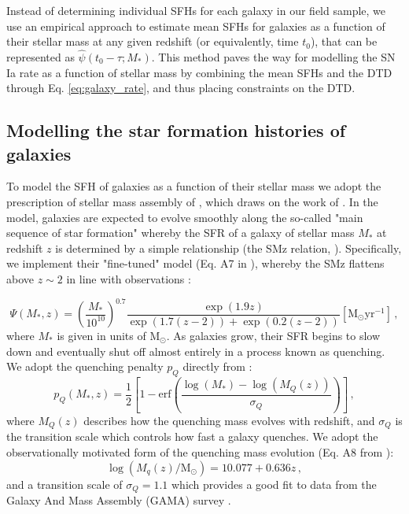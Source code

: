 \documentclass[fleqn,usenatbib]{mnras}
\begin{document}
Instead of determining individual SFHs for each galaxy in our field sample, we use an empirical approach to estimate mean SFHs for galaxies as a function of their stellar mass at any given redshift (or equivalently, time $t_0$), that can be represented as $\hat \psi \left(t_0 -\tau; M_* \right)$. This method paves the way for modelling the SN Ia rate as a function of stellar mass by combining the mean SFHs and the DTD through Eq. \ref{eq:galaxy_rate}, and thus placing constraints on the DTD.

\subsection{Modelling the star formation histories of galaxies \label{subsec:method_sfh}}

To model the SFH of galaxies as a function of their stellar mass we adopt the prescription of stellar mass assembly of , which draws on the work of \citet{Zahid2012}. In the model, galaxies are expected to evolve smoothly along the so-called "main sequence of star formation" whereby the SFR of a galaxy of stellar mass $M_*$ at redshift $z$ is determined by a simple relationship (the SMz relation, \citealt{Zahid2012}). Specifically, we implement their "fine-tuned" model (Eq. A7 in ), whereby the SMz flattens above $z\sim2$ in line with observations \citep{Stark2013}:

\begin{equation}
    \Psi(M_*,z) = \left(\frac{M_*}{10^{10}}\right)^{0.7}\frac{\exp{\left(1.9z\right)}}{\exp{\left(1.7\left(z-2\right)\right)} + \exp{\left(0.2\left(z-2\right)\right)} } [\mathrm{M}_{\odot} \mathrm{yr}^{-1}]\,,
    \label{eq:psi_mz}
\end{equation}
where $M_*$ is given in units of $\mathrm{M}_{\odot}$.
As galaxies grow, their SFR begins to slow down and eventually shut off almost entirely in a process known as quenching. We adopt the quenching penalty $p_Q$ directly from :
\begin{equation}
    p_Q(M_*,z) = \frac{1}{2}\left[1 - \mathrm{erf}\left(\frac{\log(M_*) - \log(M_Q(z))}{\sigma_Q}\right)\right]\,,
    \label{eq:pq}
\end{equation}
where $M_Q(z)$ describes how the quenching mass evolves with redshift, and $\sigma_Q$ is the transition scale which controls how fast a galaxy quenches. We adopt the observationally motivated form of the quenching mass evolution (Eq. A8 from ):
\begin{equation}
    \log(M_q(z)/\mathrm{M}_{\odot}) = 10.077 + 0.636z \,, 
    \label{eq:mq}
\end{equation}
and a transition scale of $\sigma_Q = 1.1$ which provides a good fit to data from the Galaxy And Mass Assembly (GAMA) survey \citep{Baldry2012}.
\end{document}
